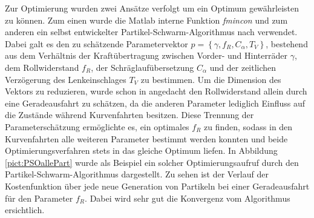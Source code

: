 Zur Optimierung wurden zwei Ansätze verfolgt um ein Optimum gewährleisten zu können. Zum einen wurde die Matlab interne Funktion \textit{fmincon} und zum anderen ein selbst entwickelter Partikel-Schwarm-Algorithmus nach \cite{PSO} verwendet. Dabei galt es den zu schätzende Parametervektor $p=\left \{ \gamma, f_R, C_{\alpha}, T_V\right \}$, bestehend aus dem Verhältnis der Kraftübertragung zwischen Vorder- und Hinterräder $\gamma$, dem Rollwiderstand $f_R$, der Schräglaufübersetzung $C_{\alpha}$ und der zeitlichen Verzögerung des Lenkeinschlages $T_V$ zu bestimmen. Um die Dimension des Vektors zu reduzieren, wurde schon in \cite{VikAnd} angedacht den Rollwiderstand allein durch eine Geradeausfahrt zu schätzen, da die anderen Parameter lediglich Einfluss auf die Zustände während Kurvenfahrten besitzen. Diese Trennung der Parameterschätzung ermöglichte es, ein optimales $f_R$ zu finden, sodass in den Kurvenfahrten alle weiteren Parameter bestimmt werden konnten und beide Optimierungsverfahren stets in das gleiche Optimum liefen. In Abbildung \ref{pict:PSOallePart} wurde als Beispiel ein solcher Optimierungsaufruf durch den Partikel-Schwarm-Algorithmus dargestellt. Zu sehen ist der Verlauf der Kostenfunktion über jede neue Generation von Partikeln bei einer Geradeausfahrt für den Parameter $f_R$. Dabei wird sehr gut die Konvergenz vom Algorithmus ersichtlich.
